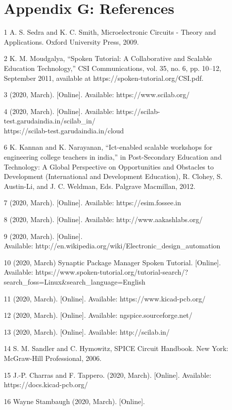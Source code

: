 \begin{enumerate}
\section {Appendix G: References}
\item [1] A. S. Sedra and K. C. Smith, Microelectronic Circuits - Theory and Applications. Oxford University Press, 2009. 
\item [2] K. M. Moudgalya, “Spoken Tutorial: A Collaborative and Scalable Education Technology,” CSI Communications, vol. 35, no. 6, pp. 10–12, September 2011, available at https://spoken-tutorial.org/CSI.pdf. 
\item [3] (2020, March). [Online]. Available: https://www.scilab.org/ 
\item [4] (2020, March). [Online].
Available: https://scilab-test.garudaindia.in/scilab\_in/ \\
https://scilab-test.garudaindia.in/cloud 
\item [6]  K. Kannan and K. Narayanan, “Ict-enabled scalable workshops for engineering college teachers in india,” in Post-Secondary Education and Technology: A Global Perspective on Opportunities and Obstacles to Development (International and Development Education), R. Clohey, S. Austin-Li, and J. C. Weldman, Eds. Palgrave Macmillan, 2012. 
\item [7]  (2020, March). [Online]. Available: https://esim.fossee.in 
\item [8] (2020, March). [Online]. Available: http://www.aakashlabs.org/ 
\item [9] (2020, March). [Online]. \\
Available: http://en.wikipedia.org/wiki/Electronic\_design\_automation
\item [10] (2020, March) Synaptic Package Manager Spoken Tutorial. [Online]. Available:  https://www.spoken-tutorial.org/tutorial-search/?search\_foss=Linux\&search\_language=English
\item [11] (2020, March). [Online]. Available: https://www.kicad-pcb.org/
\item [12] (2020, March). [Online]. Available: ngspice.sourceforge.net/
\item [13] (2020, March). [Online]. Available: http://scilab.in/ 
\item [14]   S. M. Sandler and C. Hymowitz, SPICE Circuit Handbook. New York: McGraw-Hill Professional, 2006. 
\item [15]   J.-P. Charras and F. Tappero. (2020, March). [Online]. Available: https://docs.kicad-pcb.org/
\item [16] Wayne Stambaugh (2020, March). [Online]. \\

\end{enumerate}
